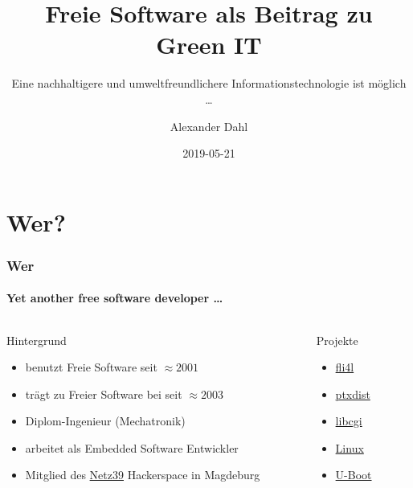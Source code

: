 \documentclass[t]{beamer}
\title[Green FLOSS]{Freie Software als Beitrag zu Green IT}
\subtitle{Eine nachhaltigere und umweltfreundlichere Informationstechnologie ist möglich …}
\author{Alexander Dahl}
\institute[blog.antiblau.de]{\url{http://blog.antiblau.de/}}
\date{2019-05-21}
\begin{document}
\begin{frame}
    \titlepage
\end{frame}



\section*{Wer?}

\begin{frame}
    \frametitle{Wer}
    \framesubtitle{Yet another free software developer \dots}

    \begin{columns}[T]
        \begin{column}{0.7\textwidth}
            \begin{block}{Hintergrund}
                \begin{itemize}
                    \item benutzt Freie Software seit $\approx 2001$
                    \item trägt zu Freier Software bei seit $\approx 2003$
                    \item Diplom-Ingenieur (Mechatronik)
                    \item arbeitet als Embedded Software Entwickler
                    \item Mitglied des \href{http://www.netz39.de/}{Netz39}
                        Hackerspace in Magdeburg
                \end{itemize}
            \end{block}
        \end{column}
        \pause
        \begin{column}{0.3\textwidth}
            \begin{block}{Projekte}
                \begin{itemize}
                    \item \href{https://www.fli4l.de/}{fli4l}
                    \item \href{https://ptxdist.org/}{ptxdist}
                    \item \href{https://github.com/rafaelsteil/libcgi}{libcgi}
                    \item \href{https://www.kernel.org/}{Linux}
                    \item \href{https://www.denx.de/wiki/U-Boot/}{U-Boot}
                \end{itemize}
            \end{block}
            
        \end{column}
    \end{columns}
\end{frame}
\end{document}

